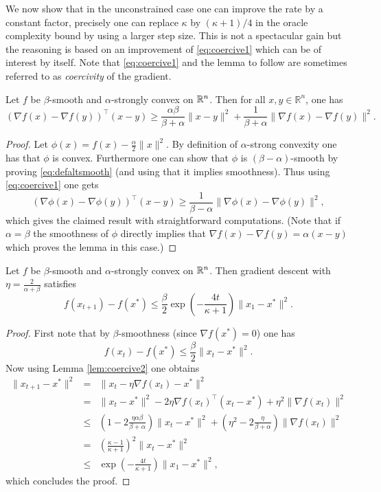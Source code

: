 We now show that in the unconstrained case one can improve the rate by a constant factor, precisely one can replace $\kappa$ by $(\kappa+1) / 4$ in the oracle complexity bound by using a larger step size. This is not a spectacular gain but the reasoning is based on an improvement of \eqref{eq:coercive1} which can be of interest by itself. Note that \eqref{eq:coercive1} and the lemma to follow are sometimes referred to as {\em coercivity} of the gradient.

\begin{lemma} \label{lem:coercive2}
Let $f$ be $\beta$-smooth and $\alpha$-strongly convex on $\mathbb{R}^n$. Then for all $x, y \in \mathbb{R}^n$, one has
$$(\nabla f(x) - \nabla f(y))^{\top} (x - y) \geq \frac{\alpha \beta}{\beta + \alpha} \|x-y\|^2 + \frac{1}{\beta + \alpha} \|\nabla f(x) - \nabla f(y)\|^2 .$$
\end{lemma}

\begin{proof}
Let $\phi(x) = f(x) - \frac{\alpha}{2} \|x\|^2$. By definition of $\alpha$-strong convexity one has that $\phi$ is convex. Furthermore one can show that $\phi$ is $(\beta-\alpha)$-smooth by proving \eqref{eq:defaltsmooth} (and using that it implies smoothness). Thus using \eqref{eq:coercive1} one gets
$$(\nabla \phi(x) - \nabla \phi(y))^{\top} (x - y) \geq \frac{1}{\beta - \alpha} \|\nabla \phi(x) - \nabla \phi(y)\|^2 ,$$
which gives the claimed result with straightforward computations. (Note that if $\alpha = \beta$ the smoothness of $\phi$ directly implies that $\nabla f(x) - \nabla f(y) = \alpha (x-y)$ which proves the lemma in this case.)
\end{proof}

\begin{theorem}
Let $f$ be $\beta$-smooth and $\alpha$-strongly convex on $\mathbb{R}^n$. Then gradient descent with $\eta = \frac{2}{\alpha + \beta}$ satisfies
$$f(x_{t+1}) - f(x^*) \leq \frac{\beta}{2} \exp\left( - \frac{4 t}{\kappa+1} \right) \|x_1 - x^*\|^2 .$$
\end{theorem}

\begin{proof}
First note that by $\beta$-smoothness (since $\nabla f(x^*) = 0$) one has
$$f(x_t) - f(x^*) \leq \frac{\beta}{2} \|x_t - x^*\|^2 .$$
Now using Lemma \ref{lem:coercive2} one obtains
\begin{eqnarray*}
\|x_{t+1} - x^*\|^2& = & \|x_{t} - \eta \nabla f(x_{t}) - x^*\|^2 \\
& = & \|x_{t} - x^*\|^2 - 2 \eta \nabla f(x_{t})^{\top} (x_{t} - x^*) + \eta^2 \|\nabla f(x_{t})\|^2 \\
& \leq & \left(1 - 2 \frac{\eta \alpha \beta}{\beta + \alpha}\right)\|x_{t} - x^*\|^2 + \left(\eta^2 - 2 \frac{\eta}{\beta + \alpha}\right) \|\nabla f(x_{t})\|^2 \\
& = & \left(\frac{\kappa - 1}{\kappa+1}\right)^2 \|x_{t} - x^*\|^2 \\
& \leq & \exp\left( - \frac{4 t}{\kappa+1} \right) \|x_1 - x^*\|^2 ,
\end{eqnarray*}
which concludes the proof.
\end{proof}

